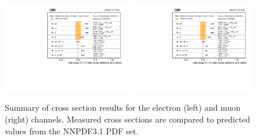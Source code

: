 \begin{figure}[htpb]
\includegraphics[width=0.49\textwidth]{plots/Results/xsecSummary13TeV_ele.pdf}
\includegraphics[width=0.49\textwidth]{plots/Results/xsecSummary13TeV_muon.pdf}
\caption{Summary of cross section results for the \sh electron (left) and muon (right) channels. Measured cross sections are compared to predicted values from the NNPDF3.1 PDF set.}
\label{fig:xs:13}
\end{figure}